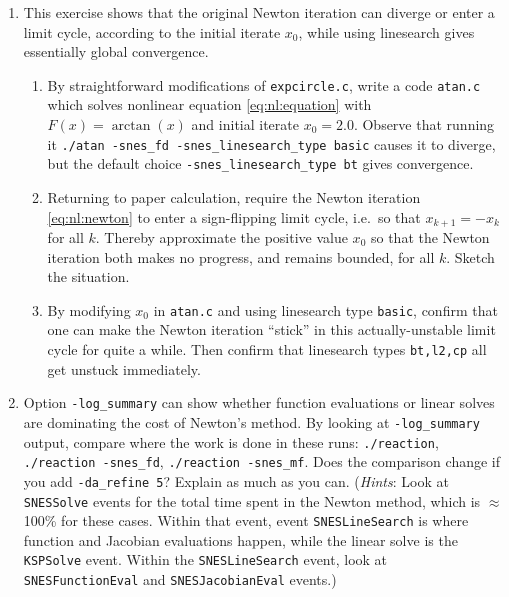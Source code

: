 \begin{enumerate}
\item  \label{exer:nl:newtonatan}
This exercise shows that the original Newton iteration can diverge or enter a limit cycle, according to the initial iterate $x_0$, while using linesearch gives essentially global convergence.
    \begin{enumerate}
    \item By straightforward modifications of \texttt{expcircle.c}, write a code \texttt{atan.c} which solves nonlinear equation \eqref{eq:nl:equation} with $F(x)=\arctan(x)$ and initial iterate $x_0=2.0$.  Observe that running it \texttt{./atan -snes\_fd -snes\_linesearch\_type basic} causes it to diverge, but the default choice \texttt{-snes\_linesearch\_type bt} gives convergence.
    \item Returning to paper calculation, require the Newton iteration \eqref{eq:nl:newton} to enter a sign-flipping limit cycle, i.e.~so that $x_{k+1} = - x_k$ for all $k$.  Thereby approximate the positive value $x_0$ so that the Newton iteration both makes no progress, and remains bounded, for all $k$.  Sketch the situation.
    \item By modifying $x_0$ in \texttt{atan.c} and using linesearch type \texttt{basic}, confirm that one can make the Newton iteration ``stick'' in this actually-unstable limit cycle for quite a while.  Then confirm that linesearch types \texttt{bt,l2,cp} all get unstuck immediately.
    \end{enumerate}

\item Option \texttt{-log\_summary} can show whether function evaluations or linear solves are dominating the cost of Newton's method.  By looking at \texttt{-log\_summary} output, compare where the work is done in these runs: \texttt{./reaction}, \texttt{./reaction -snes\_fd}, \texttt{./reaction -snes\_mf}.  Does the comparison change if you add \texttt{-da\_refine 5}?  Explain as much as you can.  (\emph{Hints}: Look at \texttt{SNESSolve} events for the total time spent in the Newton method, which is $\approx$100\% for these cases.  Within that event, event \texttt{SNESLineSearch} is where function and Jacobian evaluations happen, while the linear solve is the \texttt{KSPSolve} event.  Within the \texttt{SNESLineSearch} event, look at \texttt{SNESFunctionEval} and \texttt{SNESJacobianEval} events.)


\end{enumerate}
